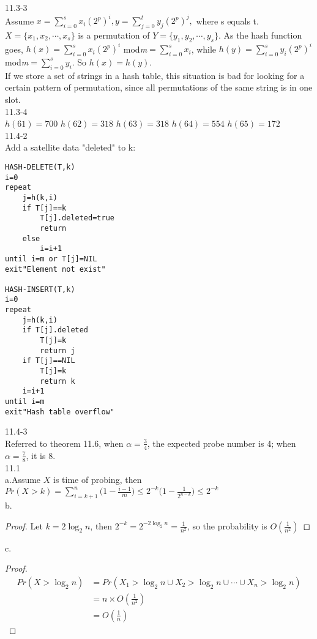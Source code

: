 \documentclass{article}
\begin{document}
11.3-3\\
Assume $x=\sum_{i=0}^{s}x_i(2^p)^i, y=\sum_{j=0}^{t}y_j(2^p)^j,$ where s equals t. $X=\{x_1, x_2,\cdots, x_s\}$ is a permutation of $Y=\{y_1, y_2,\cdots, y_s\}$. As the hash function goes, $h(x)=\sum_{i=0}^{s}x_i(2^p)^i$ mod\emph{m}$=\sum_{i=0}^{s}x_i$, while $h(y)=\sum_{i=0}^{s}y_i(2^p)^i$ mod\emph{m}$=\sum_{i=0}^{s}y_i$. So $h(x)=h(y)$.\\
If we store a set of strings in a hash table, this situation is bad for looking for a certain pattern of permutation, since all permutations of the same string is in one slot.\\
11.3-4\\
$h(61)=700$  $h(62)=318$  $h(63)=318$  $h(64)=554$  $h(65)=172$\\
11.4-2\\
Add a satellite data "deleted" to k:
\lstset{language=C}
\begin{lstlisting}
HASH-DELETE(T,k)
i=0
repeat
    j=h(k,i)
    if T[j]==k
        T[j].deleted=true
        return
    else
        i=i+1
until i=m or T[j]=NIL
exit"Element not exist"

HASH-INSERT(T,k)
i=0
repeat
    j=h(k,i)
    if T[j].deleted
        T[j]=k
        return j
    if T[j]==NIL
        T[j]=k
        return k
    i=i+1
until i=m
exit"Hash table overflow"
\end{lstlisting}
11.4-3\\
Referred to theorem 11.6, when $\alpha=\frac{3}{4}$, the expected probe number is 4; when $\alpha=\frac{7}{8}$, it is 8.\\
11.1\\
a.Assume $X$ is time of probing, then $Pr(X>k)=\sum_{i=k+1}^{n}\big(1-\frac{i-1}{m}\big)\leq 2^{-k}\big(1-\frac{1}{2^{n-k}}\big)\leq 2^{-k}$\\
b.\begin{proof}
Let $k=2\log_2{n}$, then $2^{-k}=2^{-2\log_2{n}}=\frac{1}{n^2}$, so the probability is $O(\frac{1}{n^2})$
\end{proof}
c.\begin{proof}
\begin{equation*}
\begin{aligned}
Pr(X>\log_{2}{n})&=Pr(X_1>\log_{2}{n}\cup X_2>\log_{2}{n}\cup \cdots \cup X_n>\log_{2}{n})\\
&=n\times O({\frac{1}{n^2}})\\
&=O({\frac{1}{n}})
\end{aligned}
\end{equation*}
\end{proof}
\end{document}
